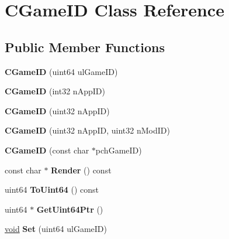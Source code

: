 \hypertarget{classCGameID}{}\section{C\+Game\+I\+D Class Reference}
\label{classCGameID}
\subsection*{Public Member Functions}
\begin{DoxyCompactItemize}
\item 
\hypertarget{classCGameID_a3f833c2bd97da350cdb77fa264b3c9e2}{}{\bfseries C\+Game\+I\+D} (uint64 ul\+Game\+I\+D)\label{classCGameID_a3f833c2bd97da350cdb77fa264b3c9e2}

\item 
\hypertarget{classCGameID_a96e5600addc687e432945d102591b61d}{}{\bfseries C\+Game\+I\+D} (int32 n\+App\+I\+D)\label{classCGameID_a96e5600addc687e432945d102591b61d}

\item 
\hypertarget{classCGameID_a7845bba8193c37dcf1bb2c1bff8bba7a}{}{\bfseries C\+Game\+I\+D} (uint32 n\+App\+I\+D)\label{classCGameID_a7845bba8193c37dcf1bb2c1bff8bba7a}

\item 
\hypertarget{classCGameID_a198b763a13ab6406b07d529ea6071d19}{}{\bfseries C\+Game\+I\+D} (uint32 n\+App\+I\+D, uint32 n\+Mod\+I\+D)\label{classCGameID_a198b763a13ab6406b07d529ea6071d19}

\item 
\hypertarget{classCGameID_a0955f9635e905aa9e249ce5067c00ce4}{}{\bfseries C\+Game\+I\+D} (const char $\ast$pch\+Game\+I\+D)\label{classCGameID_a0955f9635e905aa9e249ce5067c00ce4}

\item 
\hypertarget{classCGameID_ae2ca56798d448fb48535ddd07ccf1ae4}{}const char $\ast$ {\bfseries Render} () const \label{classCGameID_ae2ca56798d448fb48535ddd07ccf1ae4}

\item 
\hypertarget{classCGameID_adc416d14b03b0736c758c32b1ebb3472}{}uint64 {\bfseries To\+Uint64} () const \label{classCGameID_adc416d14b03b0736c758c32b1ebb3472}

\item 
\hypertarget{classCGameID_a2af52420d7023920dc5114b763b53fad}{}uint64 $\ast$ {\bfseries Get\+Uint64\+Ptr} ()\label{classCGameID_a2af52420d7023920dc5114b763b53fad}

\item 
\hypertarget{classCGameID_a0d3c64046047f1924be71178ac96fde1}{}\hyperlink{SDL__audio_8h_a52835ae37c4bb905b903cbaf5d04b05f}{void} {\bfseries Set} (uint64 ul\+Game\+I\+D)\label{classCGameID_a0d3c64046047f1924be71178ac96fde1}


\end{DoxyCompactItemize}
